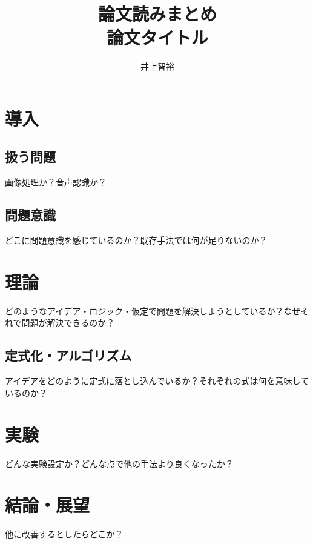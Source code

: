 \documentclass{jsarticle}
\title{\vspace{-3cm}論文読みまとめ\\論文タイトル}
\author{井上智裕}
\begin{document}
\maketitle
\vspace{-1cm}
\section{導入}
\subsection{扱う問題}
画像処理か？音声認識か？
\subsection{問題意識}
どこに問題意識を感じているのか？既存手法では何が足りないのか？

\section{理論}
どのようなアイデア・ロジック・仮定で問題を解決しようとしているか？なぜそれで問題が解決できるのか？
\subsection{定式化・アルゴリズム}
アイデアをどのように定式に落とし込んでいるか？それぞれの式は何を意味しているのか？

\section{実験}
どんな実験設定か？どんな点で他の手法より良くなったか？

\section{結論・展望}
他に改善するとしたらどこか？

\end{document}

